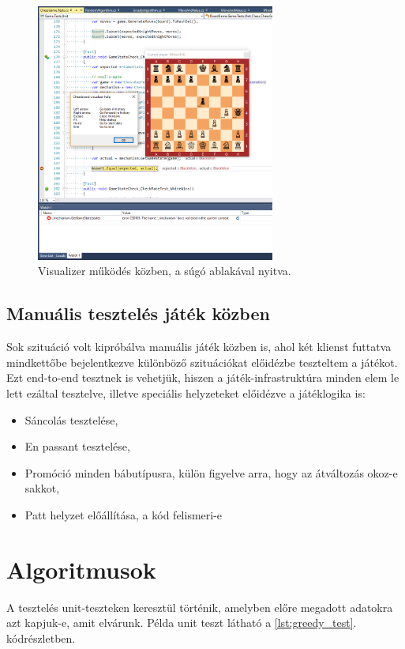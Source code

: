 \documentclass[twoside, a4paper, 12pt]{book}
\begin{document}
\begin{figure}[htbp]
	\centering
	\includegraphics[width=0.7\textwidth]{img/visualizer.png}
	\caption{Visualizer működés közben, a súgó ablakával nyitva.}
	\label{fig:visualizer}
\end{figure}

\subsection{Manuális tesztelés játék közben}
Sok szituáció volt kipróbálva manuális játék közben is, ahol két klienst futtatva mindkettőbe bejelentkezve különböző szituációkat előidézbe teszteltem a játékot. Ezt end-to-end tesztnek is vehetjük, hiszen a játék-infrastruktúra minden elem le lett ezáltal tesztelve, illetve speciális helyzeteket előidézve a játéklogika is:
\begin{itemize}
	\item Sáncolás tesztelése,
	\item En passant tesztelése,
	\item Promóció minden bábutípusra, külön figyelve arra, hogy az átváltozás okoz-e sakkot,
	\item Patt helyzet előállítása, a kód felismeri-e
\end{itemize}

\section{Algoritmusok}
A tesztelés unit-teszteken keresztül történik, amelyben előre megadott adatokra azt kapjuk-e, amit elvárunk. Példa unit teszt látható a \ref{lst:greedy_test}. kódrészletben.
\end{document}
